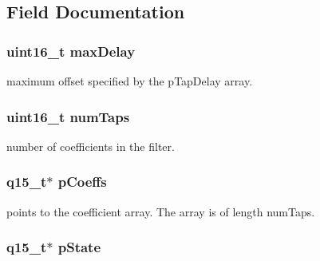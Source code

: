 \subsection{Field Documentation}
\hypertarget{structarm__fir__sparse__instance__q15_ab25f4ee7550e6d92acff77ada283733f}{
\subsubsection[{max\-Delay}]{\setlength{\rightskip}{0pt plus 5cm}uint16\-\_\-t max\-Delay}}\label{structarm__fir__sparse__instance__q15_ab25f4ee7550e6d92acff77ada283733f}
maximum offset specified by the p\-Tap\-Delay array. \hypertarget{structarm__fir__sparse__instance__q15_a751941891e47f522a7f5375fe8990aac}{
\subsubsection[{num\-Taps}]{\setlength{\rightskip}{0pt plus 5cm}uint16\-\_\-t num\-Taps}}\label{structarm__fir__sparse__instance__q15_a751941891e47f522a7f5375fe8990aac}
number of coefficients in the filter. \hypertarget{structarm__fir__sparse__instance__q15_a7ca181a37f714d174445f486bebce26f}{
\subsubsection[{p\-Coeffs}]{\setlength{\rightskip}{0pt plus 5cm}q15\-\_\-t$\ast$ p\-Coeffs}}\label{structarm__fir__sparse__instance__q15_a7ca181a37f714d174445f486bebce26f}
points to the coefficient array. The array is of length num\-Taps. \hypertarget{structarm__fir__sparse__instance__q15_ae29dfdb736374fcddaeaec4b7770170c}{
\subsubsection[{p\-State}]{\setlength{\rightskip}{0pt plus 5cm}q15\-\_\-t$\ast$ p\-State}}\label{structarm__fir__sparse__instance__q15_ae29dfdb736374fcddaeaec4b7770170c}
